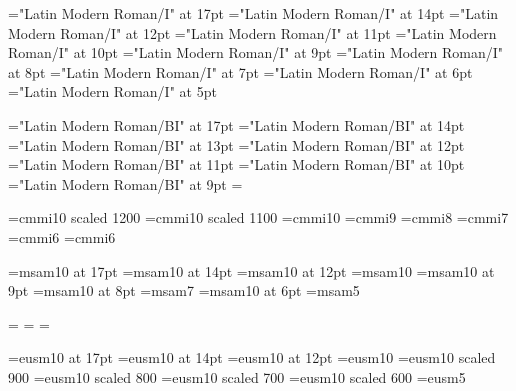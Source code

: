 % 

\font\seventeenit="Latin Modern Roman/I" at 17pt%
\font\fourteenit="Latin Modern Roman/I" at 14pt%
\font\twelveit="Latin Modern Roman/I" at 12pt%
\font\elevenit="Latin Modern Roman/I" at 11pt%
\font\tenit="Latin Modern Roman/I" at 10pt%
\font\nineit="Latin Modern Roman/I" at 9pt%
\font\eightit="Latin Modern Roman/I" at 8pt%
\font\sevenit="Latin Modern Roman/I" at 7pt%
\font\sixit="Latin Modern Roman/I" at 6pt%
\font\fiveit="Latin Modern Roman/I" at 5pt%

% 

\font\seventeenti="Latin Modern Roman/BI" at 17pt%
\font\fourteenti="Latin Modern Roman/BI" at 14pt%
\font\thirteenti="Latin Modern Roman/BI" at 13pt%
\font\twelveti="Latin Modern Roman/BI" at 12pt%
\font\eleventi="Latin Modern Roman/BI" at 11pt%
\font\tenti="Latin Modern Roman/BI" at 10pt%
\font\nineti="Latin Modern Roman/BI" at 9pt%
\newfam\bolditfam
\textfont\bolditfam=\tenti
\def\boldit{\fam\bolditfam\tenti}


% 

\font\twelvei=cmmi10 scaled 1200
\font\eleveni=cmmi10 scaled 1100
\font\teni=cmmi10
\font\ninei=cmmi9
\font\eighti=cmmi8
\font\seveni=cmmi7
\font\sixi=cmmi6
\font\fivei=cmmi6

%

\font\seventeenmsa=msam10 at 17pt   
\font\fourteenmsa=msam10 at 14pt
\font\twelvemsa=msam10 at 12pt
\font\tenmsa=msam10
\font\ninemsa=msam10 at 9pt
\font\eightmsa=msam10 at 8pt
\font\sevenmsa=msam7
\font\sixmsa=msam10 at 6pt
\font\fivemsa=msam5

\newfam\msafam
\textfont\msafam=\tenmsa
\scriptfont\msafam=\sevenmsa
\scriptscriptfont\msafam=\fivemsa


\font\seventeenscaln=eusm10 at 17pt
\font\fourteenscaln=eusm10 at 14pt
\font\twelvescaln=eusm10 at 12pt
\font\tenscaln=eusm10
\font\ninescaln=eusm10 scaled 900
\font\eightscaln=eusm10 scaled 800
\font\sevenscaln=eusm10 scaled 700
\font\sixscaln=eusm10 scaled 600
\font\fivescaln=eusm5

